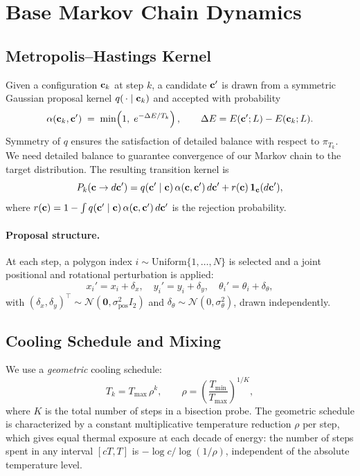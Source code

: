 \section{Base Markov Chain Dynamics}

\subsection{Metropolis--Hastings Kernel}

Given a configuration $\mathbf{c}_k$ at step $k$, a candidate $\mathbf{c}'$ is drawn
from a symmetric Gaussian proposal kernel $q(\,\cdot \mid \mathbf{c}_k)$ and
accepted with probability
\[
  \alpha(\mathbf{c}_k, \mathbf{c}')
  \;=\; \min\!\left(1,\; e^{-\Delta E / T_k}\right),
  \qquad
  \Delta E = E(\mathbf{c}'; L) - E(\mathbf{c}_k; L).
\]
Symmetry of $q$ ensures the satisfaction of detailed balance with respect to
$\pi_{T_k}$. We need detailed balance to guarantee convergence of our Markov chain 
to the target distribution. The resulting transition kernel is
\[
  P_k(\mathbf{c} \to d\mathbf{c}')
  = q(\mathbf{c}' \mid \mathbf{c})\,\alpha(\mathbf{c}, \mathbf{c}')\,d\mathbf{c}'
  + r(\mathbf{c})\,\mathbf{1}_{\mathbf{c}}(d\mathbf{c}'),
\]
where $r(\mathbf{c}) = 1 - \int q(\mathbf{c}'\mid\mathbf{c})\,\alpha(\mathbf{c},\mathbf{c}')\,d\mathbf{c}'$
is the rejection probability.

\paragraph{Proposal structure.}
At each step, a polygon index $i \sim \mathrm{Uniform}\{1,\dots,N\}$ is
selected and a joint positional and rotational perturbation is applied:
\[
  x_i' = x_i + \delta_x, \quad
  y_i' = y_i + \delta_y, \quad
  \theta_i' = \theta_i + \delta_\theta,
\]
with $(\delta_x, \delta_y)^\top \sim \mathcal{N}(\mathbf{0},
\sigma_{\mathrm{pos}}^2 I_2)$ and
$\delta_\theta \sim \mathcal{N}(0, \sigma_\theta^2)$, drawn independently.

\subsection{Cooling Schedule and Mixing}

We use a \emph{geometric} cooling schedule:
\[
  T_k = T_{\max}\,\rho^k,
  \qquad
  \rho = \left(\frac{T_{\min}}{T_{\max}}\right)^{1/K},
\]
where $K$ is the total number of steps in a bisection probe.
The geometric schedule is characterized by a constant multiplicative
temperature reduction $\rho$ per step, which gives equal thermal exposure
at each decade of energy: the number of steps spent in any interval
$[cT, T]$ is $-\log c / \log(1/\rho)$, independent of the absolute
temperature level.



